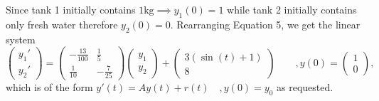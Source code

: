 \documentclass[
	12pt,
	]{article}
\theoremstyle{definition}
\theoremstyle{definition}
\theoremstyle{definition}
\theoremstyle{definition}
\theoremstyle{definition}
\theoremstyle{example}
\theoremstyle{note}
\theoremstyle{remark}
\theoremstyle{example}
\begin{document}
				\noindent Since tank 1 initially contains $1  \si{\kilogram} \implies y_{1}(0) = 1$ while tank 2 initially contains only fresh water therefore $y_{2}(0) =0$. Rearranging Equation 5, we get the linear system
				\begin{equation*}
					\begin{pmatrix}
						y_{1}' \\ y_{2}'
					\end{pmatrix}
					= 
					\begin{pmatrix}
						-\frac{13}{100} & \frac15 \\ \frac{1}{10} & -\frac{7}{25}
					\end{pmatrix}
					\begin{pmatrix}
						y_{1} \\ y_{2}
					\end{pmatrix}
					+ 
					\begin{pmatrix}
						3(\sin(t) +1) \\ 8
					\end{pmatrix}
					\qquad , y(0) = \begin{pmatrix}
						1 \\ 0
					\end{pmatrix},
				\end{equation*}
				which is of the form $y'(t) = Ay(t) + r(t) \quad, y(0) = y_{0}$ as requested.
				
\end{document}
